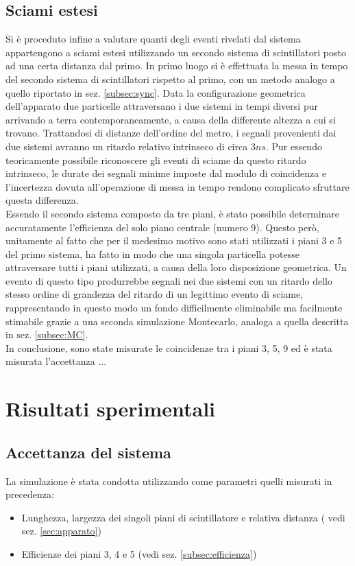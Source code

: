 \documentclass[11pt]{article}
\begin{document}
\begin{flushleft}
\subsection{Sciami estesi}
Si è proceduto infine a valutare quanti degli eventi rivelati dal sistema appartengono a sciami estesi utilizzando un secondo sistema di scintillatori posto ad una certa distanza dal primo. In primo luogo si è effettuata la messa in tempo del secondo sistema di scintillatori rispetto al primo, con un metodo analogo a quello riportato in sez. \ref{subsec:sync}. Data la configurazione geometrica dell'apparato due particelle attraversano i due sistemi in tempi diversi pur arrivando a terra contemporaneamente, a causa della differente altezza a cui si trovano. Trattandosi di distanze dell'ordine del metro, i segnali provenienti dai due sistemi avranno un ritardo relativo intrinseco di circa $3 ns$. Pur essendo teoricamente possibile riconoscere gli eventi di sciame da questo ritardo intrinseco, le durate dei segnali minime imposte dal modulo di coincidenza e l'incertezza dovuta all'operazione di messa in tempo rendono complicato sfruttare questa differenza. \\
Essendo il secondo sistema composto da tre piani, è stato possibile determinare accuratamente l'efficienza del solo piano centrale (numero 9). Questo però, unitamente al fatto che per il medesimo motivo sono stati utilizzati i piani 3 e 5 del primo sistema, ha fatto in modo che una singola particella potesse attraversare tutti i piani utilizzati, a causa della loro disposizione geometrica. Un evento di questo tipo produrrebbe segnali nei due sistemi con un ritardo dello stesso ordine di grandezza del ritardo di un legittimo evento di sciame, rappresentando in questo modo un fondo difficilmente eliminabile ma facilmente stimabile grazie a una seconda simulazione Montecarlo, analoga a quella descritta in sez. \ref{subsec:MC}. \\
In conclusione, sono state misurate le coincidenze tra i piani 3, 5, 9 ed è stata misurata l'accettanza ...

\section{Risultati sperimentali}
\subsection{Accettanza del sistema}
La simulazione è stata condotta utilizzando come parametri quelli misurati in precedenza:
\begin{itemize}
\item{Lunghezza, largezza dei singoli piani di scintillatore e relativa distanza (
vedi sez. \ref{sec:apparato}})
\item{Efficienze dei piani 3, 4 e 5 (vedi sez. \ref{subsec:efficienza})}
\end{itemize}


\end{flushleft}
\end{document}
